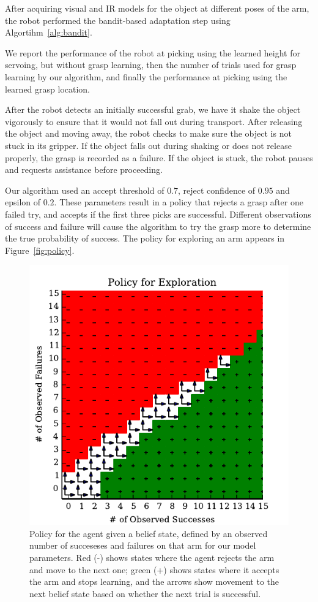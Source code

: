 \documentclass{article}
\begin{document}
After acquiring visual and IR models for the object at different poses
of the arm, the robot performed the bandit-based adaptation step using
Algortihm~\ref{alg:bandit}.

We report the performance of the robot at picking using the learned
height for servoing, but without grasp learning, then the number of
trials used for grasp learning by our algorithm, and finally the
performance at picking using the learned grasp location.

After the robot detects an initially successful grab, we have it
shake the object vigorously to ensure that it would not fall out during
transport. After releasing the object and moving away, the robot checks 
to make sure the object is not stuck in its gripper. If the object
falls out during shaking or does not release properly, the grasp is
recorded as a failure. If the object is stuck, the robot pauses and
requests assistance before proceeding.

Our algorithm used an accept threshold of $0.7$, reject confidence of
$0.95$ and epsilon of $0.2$.  These parameters result in a policy that
rejects a grasp after one failed try, and accepts if the first three
picks are successful.  Different observations of success and failure
will cause the algorithm to try the grasp more to determine the true
probability of success.  The policy for exploring an arm appears in
Figure~\ref{fig:policy}.

\begin{figure}
\includegraphics{figures/policy.pdf}
\caption{Policy for the agent given a belief state, defined by an
  observed number of succeseses and failures on that arm for our model
  parameters.  Red (-) shows states where the agent rejects the arm
  and move to the next one; green (+) shows states where it accepts
  the arm and stops learning, and the arrows show movement to the next
  belief state based on whether the next trial is successful.}
\end{figure}
\end{document}
